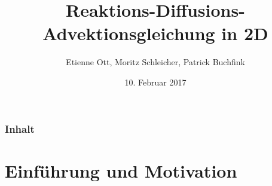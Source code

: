 \documentclass[aspectratio=32]{beamer}
\title{Reaktions-Diffusions-Advektionsgleichung in 2D}
\author{Etienne Ott, Moritz Schleicher, Patrick Buchfink }
\institute{Numerische Simulation WS16/17}
\date{10. Februar 2017}
\newcommand{\sectionframe}{\begin{frame}
	\begin{center}
		\textcolor{simtechred}{\Large\insertsection}
	\end{center}
\end{frame}}
\begin{document}
\begin{frame}[plain]
\titlepage
\end{frame}

\setcounter{framenumber}{0}

\begin{frame}
\frametitle{Inhalt}
\tableofcontents
\end{frame}

\section{Einführung und Motivation}
\sectionframe
\end{document}

